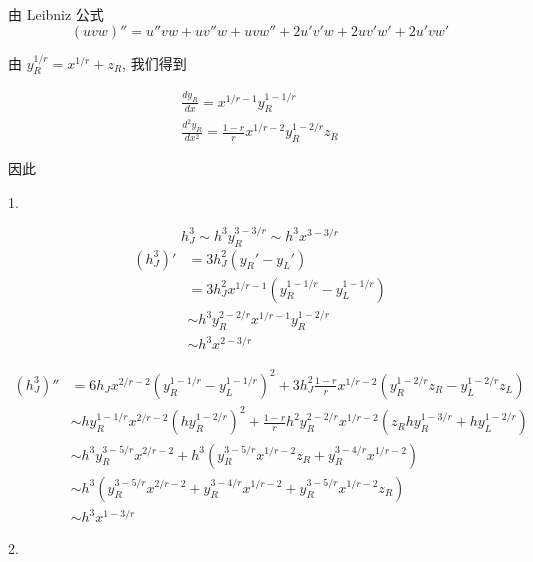 \documentclass{ctexart}
\theoremstyle{definition}
\theoremstyle{remark}
\numberwithin{equation}{section}
\begin{document}
由 Leibniz 公式
\begin{equation}
    (uvw)'' = u''vw + uv''w + uvw'' + 2u'v'w + 2uv'w' + 2u'vw'
\end{equation}

由 \(y_R^{1/r} = x^{1/r} + z_R\), 我们得到

\begin{gather}
    \frac{d y_R}{dx} = x^{1/r-1} y_R^{1-1/r}    \\
    \frac{d^2 y_R}{dx^2} = \frac{1-r}{r} x^{1/r-2} y_R^{1-2/r}z_R
\end{gather}

因此

1.

\begin{equation}
    h_J^3 \sim h^3 y_R^{3-3/r} \sim h^3 x^{3-3/r}
\end{equation}
\begin{equation}
    \begin{aligned}
        (h_J^3)' & = 3 h_J^2 (y_R' - y_L ')                       \\
                 & = 3 h_J^2 x^{1/r-1}(y_R^{1-1/r} - y_L^{1-1/r}) \\
                 & \sim h^3 y_R^{2-2/r} x^{1/r-1} y_R^{1-2/r}     \\
                 & \sim h^3 x^{2-3/r}
    \end{aligned}
\end{equation}


\begin{equation}
    \begin{aligned}
        (h_J^3)'' & = 6 h_J x^{2/r-2}(y_R^{1-1/r}-y_L^{1-1/r})^2 + 3 h_J^2 \frac{1-r}{r} x^{1/r-2}(y_R^{1-2/r}z_R-y_L^{1-2/r}z_L)             \\
                  & \sim h y_R^{1-1/r} x^{2/r-2} (hy_R^{1-2/r})^2 + \frac{1-r}{r} h^2 y_R^{2-2/r} x^{1/r-2}(z_R h y_R^{1-3/r} + hy_L^{1-2/r}) \\
                  & \sim h^3 y_R^{3-5/r} x^{2/r-2} + h^3 (y_R^{3-5/r}x^{1/r-2}z_R + y_R^{3-4/r} x^{1/r-2})                                    \\
                  & \sim h^3 ( y_R^{3-5/r} x^{2/r-2} + y_R^{3-4/r} x^{1/r-2} + y_R^{3-5/r}x^{1/r-2}z_R)                                       \\
                  & \sim  h^3 x^{1-3/r}
    \end{aligned}
\end{equation}


2.
\end{document}
